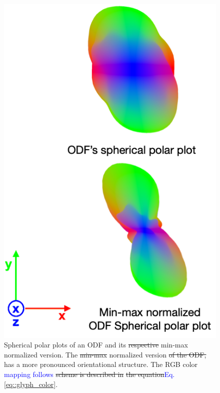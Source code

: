 \documentclass[twoside,twocolumn,10pt]{article}
\begin{document}
\begin{figure}[htb]
    \centering
    \includegraphics[width=.45\linewidth, angle=0]{figs/SphericalMeshModulation.png}
    \caption{Spherical polar plots of an ODF and its \sout{respective} min-max normalized version. The \sout{min-max} normalized version \sout{of the ODF,} has a more pronounced orientational structure. The RGB color \textcolor{blue}{mapping follows} \sout{scheme is described in} \sout{the equation}\textcolor{blue}{Eq.} \ref{eq::glyph_color}.}
    \label{fig::intro_glyph}
\end{figure}

\end{document}

